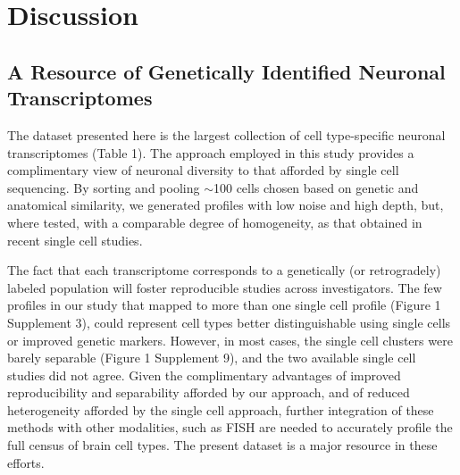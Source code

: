 
\section{Discussion}

\subsection{A Resource of Genetically Identified Neuronal Transcriptomes}

The dataset presented here is the largest collection of cell type-specific neuronal transcriptomes (Table 1). The approach employed in this study provides a complimentary view of neuronal diversity to that afforded by single cell sequencing. By sorting and pooling $\sim$100 cells chosen based on genetic and anatomical similarity, we generated profiles with low noise and high depth, but, where tested, with a comparable degree of homogeneity, as that obtained in recent single cell studies. 

The fact that each transcriptome corresponds to a genetically (or retrogradely) labeled population will foster reproducible studies across investigators. The few profiles in our study that mapped to more than one single cell profile (Figure 1 Supplement 3), could represent cell types better distinguishable using single cells or improved genetic markers. However, in most cases, the single cell clusters were barely separable (Figure 1 Supplement 9), and the two available single cell studies did not agree. Given the complimentary advantages of improved reproducibility and separability afforded by our approach, and of reduced heterogeneity afforded by the single cell approach, further integration of these methods with other modalities, such as FISH \citep{Moffitt_2016} are needed to accurately profile the full census of brain cell types. The present dataset is a major resource in these efforts. 

